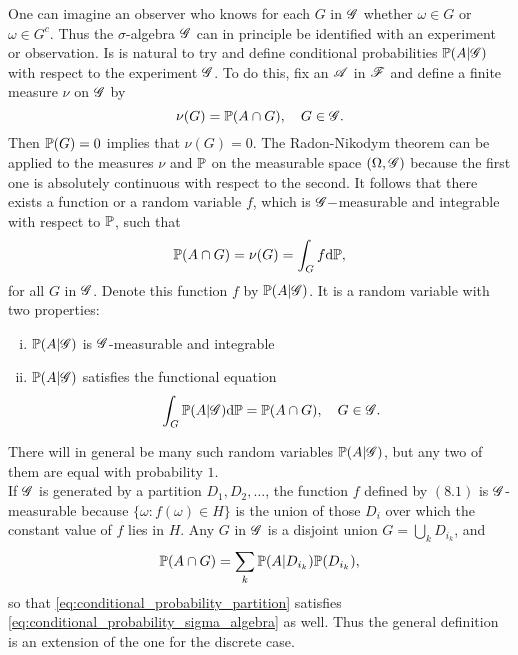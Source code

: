 One can imagine an observer who knows for each $G$ in $\mathcal{G}$ whether $\omega \in G$ or $\omega \in G^c$. Thus the $\sigma$-algebra $\mathcal{G}$ can in principle be identified with an experiment or observation. Is is natural to try and define conditional probabilities $\mathbb{P}(A | \mathcal{G})$ with respect to the experiment $\mathcal{G}$. To do this, fix an $\mathcal{A}$ in $\mathcal{F}$ and define a finite measure $\nu$ on $\mathcal{G}$ by
\begin{equation}
    \nu (G) = \mathbb{P}(A \cap G), \quad G \in \mathcal{G}.
\end{equation}
Then $\mathbb{P}(G) = 0$ implies that $\nu (G) = 0$. The Radon-Nikodym theorem can be applied to the measures $\nu$ and $\mathbb{P}$ on the measurable space $(\Omega, \mathcal{G})$ because the first one is absolutely continuous with respect to the second. It follows that there exists a function or a random variable $f$, which is $\mathcal{G}-$measurable and integrable with respect to $\mathbb{P}$, such that 
\begin{equation}
    \mathbb{P}(A \cap G) = \nu (G) = \int_G f \mathrm{d} \mathbb{P},
\end{equation}
for all $G$ in $\mathcal{G}$. Denote this function $f$ by $\mathbb{P}(A | \mathcal{G})$. It is a random variable with two properties:
\begin{enumerate}[(i)]
    \item $\mathbb{P}(A | \mathcal{G})$ is $\mathcal{G}$-measurable and integrable
    \item $\mathbb{P}(A | \mathcal{G})$ satisfies the functional equation
    \begin{equation} \label{eq:conditional_probability_sigma_algebra}
        \int_G \mathbb{P}(A | \mathcal{G}) \mathrm{d} \mathbb{P} = \mathbb{P}(A \cap G), \quad G \in \mathcal{G}.
    \end{equation}
\end{enumerate}
There will in general be many such random variables $\mathbb{P}(A | \mathcal{G})$, but any two of them are equal with probability $1$.\\

If $\mathcal{G}$ is generated by a partition $D_1, D_2, \dots$, the function $f$ defined by $(8.1)$ is $\mathcal{G}$-measurable because $\{ \omega: f(\omega) \in H \}$ is the union of those $D_i$ over which the constant value of $f$ lies in $H$. Any $G$ in $\mathcal{G}$ is a disjoint union $G = \bigcup_{k} D_{i_k}$, and 
\begin{equation}
    \mathbb{P}(A \cap G) = \sum_k \mathbb{P}(A | D_{i_k})\mathbb{P}(D_{i_k}),
\end{equation}
so that \eqref{eq:conditional_probability_partition} satisfies \eqref{eq:conditional_probability_sigma_algebra} as well. Thus the general definition is an extension of the one for the discrete case.\\

